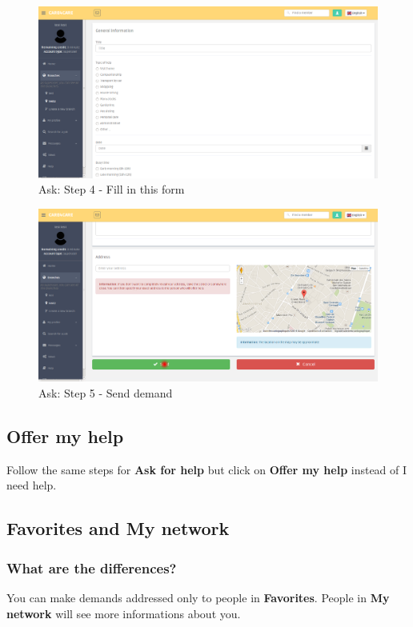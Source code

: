 \documentclass{article}
\begin{document}
\begin{figure}[!ht]
   \includegraphics[width=\textwidth]{img/dem4.png}
   \caption{Ask: Step 4 - Fill in this form}
\end{figure}
\begin{figure}[!ht]
   \includegraphics[width=\textwidth]{img/dem5.png}
   \caption{Ask: Step 5 - Send demand}
\end{figure}

\clearpage
\subsection{Offer my help}
Follow the same steps for \textbf{Ask for help} but click on \textbf{Offer my help} instead of I need help.


\subsection{Favorites and My network}
\subsubsection{What are the differences?}
You can make demands addressed only to people in \textbf{Favorites}.
People in \textbf{My network} will see more informations about you.
\end{document}
